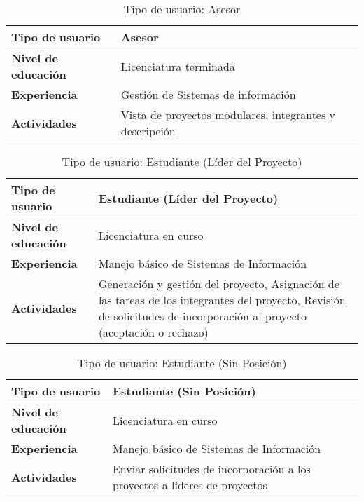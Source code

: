 	\begin{table}[h!]
		\centering
		\begin{tabular}{|l|p{11cm}|}
			\hline
			\textbf{Tipo de usuario}    & \textbf{Asesor}                                         \\
			\hline
			\textbf{Nivel de educación} & Licenciatura terminada                                  \\
			\hline
			\textbf{Experiencia}        & Gestión de Sistemas de información                      \\
			\hline
			\textbf{Actividades}        & Vista de proyectos modulares, integrantes y descripción \\
			\hline
		\end{tabular}
		\caption{Tipo de usuario: Asesor}
	\end{table}

	\begin{table}[h!]
		\centering
		\begin{tabular}{|l|p{11cm}|}
			\hline
			\textbf{Tipo de usuario}    & \textbf{Estudiante (Líder del Proyecto)}                                                                                                                                 \\
			\hline
			\textbf{Nivel de educación} & Licenciatura en curso                                                                                                                                                    \\
			\hline
			\textbf{Experiencia}        & Manejo básico de Sistemas de Información                                                                                                                                 \\
			\hline
			\textbf{Actividades}        & Generación y gestión del proyecto, Asignación de las tareas de los integrantes del proyecto, Revisión de solicitudes de incorporación al proyecto (aceptación o rechazo) \\
			\hline
		\end{tabular}
		\caption{Tipo de usuario: Estudiante (Líder del Proyecto)}
	\end{table}

	\begin{table}[h!]
		\centering
		\begin{tabular}{|l|p{11cm}|}
			\hline
			\textbf{Tipo de usuario}    & \textbf{Estudiante (Sin Posición)}                                         \\
			\hline
			\textbf{Nivel de educación} & Licenciatura en curso                                                      \\
			\hline
			\textbf{Experiencia}        & Manejo básico de Sistemas de Información                                   \\
			\hline
			\textbf{Actividades}        & Enviar solicitudes de incorporación a los proyectos a líderes de proyectos \\
			\hline
		\end{tabular}
		\caption{Tipo de usuario: Estudiante (Sin Posición)}
	\end{table}

